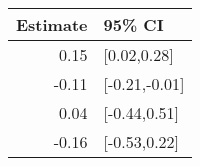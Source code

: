 \begin{tabular}{rl}
  \hline
Estimate & 95\% CI \\ 
  \hline
0.15 & [0.02,0.28] \\ 
  -0.11 & [-0.21,-0.01] \\ 
  0.04 & [-0.44,0.51] \\ 
  -0.16 & [-0.53,0.22] \\ 
   \hline
\end{tabular}

